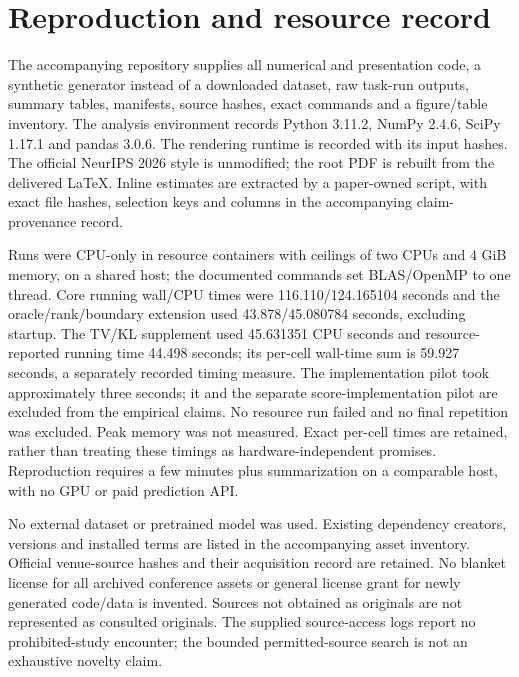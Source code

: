 \section{Reproduction and resource record}
\label{app:reproduction}
The accompanying repository supplies all numerical and presentation code, a synthetic generator instead of a downloaded dataset, raw task-run outputs, summary tables, manifests, source hashes, exact commands and a figure/table inventory. The analysis environment records Python 3.11.2, NumPy 2.4.6, SciPy 1.17.1 and pandas 3.0.6. The rendering runtime is recorded with its input hashes. The official NeurIPS 2026 style is unmodified; the root PDF is rebuilt from the delivered LaTeX. Inline estimates are extracted by a paper-owned script, with exact file hashes, selection keys and columns in the accompanying claim-provenance record.

Runs were CPU-only in resource containers with ceilings of two CPUs and 4 GiB memory, on a shared host; the documented commands set BLAS/OpenMP to one thread. Core running wall/CPU times were 116.110/124.165104 seconds and the oracle/rank/boundary extension used 43.878/45.080784 seconds, excluding startup. The TV/KL supplement used 45.631351 CPU seconds and resource-reported running time 44.498 seconds; its per-cell wall-time sum is 59.927 seconds, a separately recorded timing measure. The implementation pilot took approximately three seconds; it and the separate score-implementation pilot are excluded from the empirical claims. No resource run failed and no final repetition was excluded. Peak memory was not measured. Exact per-cell times are retained, rather than treating these timings as hardware-independent promises. Reproduction requires a few minutes plus summarization on a comparable host, with no GPU or paid prediction API.

No external dataset or pretrained model was used. Existing dependency creators, versions and installed terms are listed in the accompanying asset inventory. Official venue-source hashes and their acquisition record are retained. No blanket license for all archived conference assets or general license grant for newly generated code/data is invented. Sources not obtained as originals are not represented as consulted originals. The supplied source-access logs report no prohibited-study encounter; the bounded permitted-source search is not an exhaustive novelty claim.
